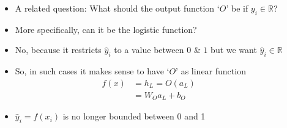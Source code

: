 \begin{frame}
  \begin{columns}
    \begin{overlayarea}{\textwidth}{\textheight}
      \makebox[\textwidth][c]{\usebox{\nncontent}}
    \end{overlayarea}


    \begin{overlayarea}{\textwidth}{\textheight}
      \begin{itemize}[<+->]
      \justifying
        \item A related question: What should the output function `$O$' be if $y_i \in \mathbb{R}$?
        \item More specifically, can it be the logistic function?
        \item No, because it restricts $\hat{y}_i$ to a value between $0$ \& $1$ but we want $\hat{y}_i \in \mathbb{R}$
        \item So, in such cases it makes sense to have `$O$' as linear function
            \begin{align*}
              f(x) & = h_{L} = O(a_{L})             \\
                  &= W_{O}a_{L} + b_{O}
            \end{align*}

        \item $\hat{y}_i = f(x_i)$ is no longer bounded between 0 and 1
      \end{itemize}
    \end{overlayarea}
  \end{columns}
\end{frame}

\begin{frame}[b]
\end{frame}


